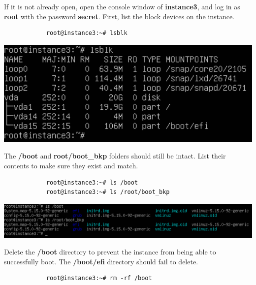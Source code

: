 \documentclass[letterpaper, 12pt]{article}
\begin{document}
\begin{enumerate}
    \begin{labstep}
        If it is not already open, open the console window of \textbf{instance3}, and log in as \textbf{root} with the password \textbf{secret}.
        First, list the block devices on the instance.
        \begin{lstlisting}
            root@instance3:~# lsblk
        \end{lstlisting}

        \begin{center}
            \includegraphics[width=\linewidth]{images/part8/step1.png}
        \end{center}
    \end{labstep}

    \begin{labstep}
        The \textbf{/boot} and \textbf{root/boot\_bkp} folders should still be intact.
        List their contents to make sure they exist and match.
        \begin{lstlisting}
            root@instance3:~# ls /boot
            root@instance3:~# ls /root/boot_bkp
        \end{lstlisting}

        \begin{center}
            \includegraphics[width=\linewidth]{images/part8/step2.png}
        \end{center}
    \end{labstep}

    \begin{labstep}
        Delete the \textbf{/boot} directory to prevent the instance from being able to successfully boot.
        The \textbf{/boot/efi} directory should fail to delete.
        \begin{lstlisting}
            root@instance3:~# rm -rf /boot
        \end{lstlisting}


\end{labstep}
\end{enumerate}
\end{document}
